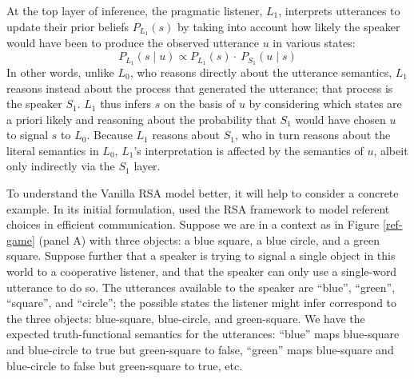 \documentclass{sp}
\begin{document}
At the top layer of inference, the pragmatic listener, $L_1$, interprets utterances to update their prior beliefs $P_{{L_1}}(s)$ by taking into account how likely the speaker would have been to produce the observed utterance $u$ in various states:
\begin{equation} \label{L1}
P_{L_1}(s \mid u) \propto P_{L_1}(s) \cdot \ P_{S_1}(u \mid s)
\end{equation}
In other words, unlike $L_0$, who reasons directly about the utterance semantics, $L_1$ reasons instead about the process that generated the utterance; that process is the speaker $S_1$. $L_1$ thus infers $s$ on the basis of $u$ by considering which states are a priori likely and reasoning about the probability that $S_1$ would have chosen $u$ to signal $s$ to $L_0$. Because $L_1$ reasons about $S_1$, who in turn reasons about the literal semantics in $L_0$, $L_1$'s interpretation is affected by the semantics of $u$, albeit only indirectly via the $S_1$ layer.

To understand the Vanilla RSA model better, it will help to consider a concrete example.
In its initial formulation, \cite{frankgoodman2012} used the RSA framework to model referent choices in efficient communication. Suppose we are in a context as in Figure \ref{ref-game} (panel A) with three objects: a blue square, a blue circle, and a green square. Suppose further that a speaker is trying to signal a single object in this world to a cooperative listener, and that the speaker can only use a single-word utterance to do so. The utterances available to the speaker are ``blue'', ``green'', ``square'', and ``circle''; the possible states the listener might infer correspond to the three objects: blue-square, blue-circle, and green-square. We have the expected truth-functional semantics for the utterances: ``blue'' maps blue-square and blue-circle to true but green-square to false, ``green'' maps blue-square and blue-circle to false but green-square to true, etc.
\end{document}
